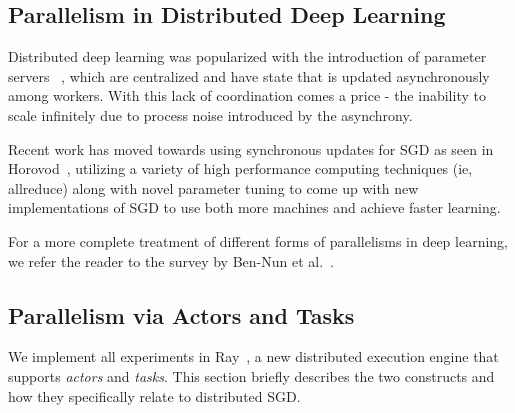 \documentclass{article}
\begin{document}
\subsection{Parallelism in Distributed Deep Learning}
Distributed deep learning was popularized with the introduction of parameter servers ~\cite{param-server}, which are centralized and have state that is updated asynchronously among workers. With this lack of coordination comes a price - the inability to scale infinitely due to process noise introduced by the asynchrony.

Recent work has moved towards using synchronous updates for SGD as seen in Horovod~\cite{horovod}, utilizing a variety of high performance computing techniques (ie, allreduce) along with novel parameter tuning to come up with new implementations of SGD to use both more machines and achieve faster learning.

For a more complete treatment of different forms of parallelisms in deep learning, we refer the reader to the survey by Ben-Nun et al.~\cite{ben-nun18_demys_paral_distr_deep_learn}.

\subsection{Parallelism via Actors and Tasks}
We implement all experiments in Ray~\cite{ray}, a new distributed execution engine that supports \textit{actors} and \textit{tasks}.  This section briefly describes the two constructs and how they specifically relate to distributed SGD.

\end{document}
